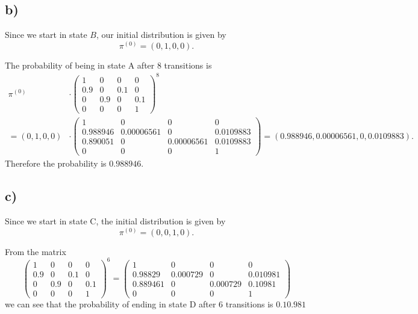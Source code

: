 \documentclass[a4paper]{article}
\begin{document}
\subsection*{b)}
Since we start in state $B$, our initial distribution is given by 
$$\pi^{(0)} = (0,1,0,0).$$

The probability of being in state A after 8 transitions is 
\begin{align*} \pi^{(0)} &\cdot \begin{pmatrix} 
									1 	& 0 	& 0 	& 0 	\\
									0.9 	& 0 	& 0.1 	& 0 \\
									0 	& 0.9 	& 0 	& 0.1 	\\
									0 	& 0 	& 0 	& 1 	
								\end{pmatrix}^8 \\
= (0,1,0,0) &\cdot \begin{pmatrix} 
									1 	& 0 	& 0 	& 0 	\\
									0.988946 	& 0.00006561 	& 0 	& 0.0109883 \\
									0.890051 	& 0 	& 0.00006561 	& 0.0109883 	\\
									0 	& 0 	& 0 	& 1 	
								\end{pmatrix} = (0.988946, 0.00006561, 0, 0.0109883).                                
\end{align*}
Therefore the probability is $0.988946$.

\subsection*{c)}
Since we start in state C, the initial distribution is given by
$$\pi^{(0)} = (0,0,1,0).$$

From the matrix 
$$
\begin{pmatrix} 
1 	& 0 	& 0 	& 0 	\\
0.9 & 0 	& 0.1 	& 0 	\\
0 	& 0.9 	& 0 	& 0.1 	\\
0 	& 0 	& 0 	& 1 	
\end{pmatrix}^6 
= 
\begin{pmatrix} 
1 	& 0 	& 0 	& 0 	\\
0.98829 & 0.000729 	& 0 	& 0.010981 	\\
0.889461 	& 0 	& 0.000729 	& 0.10981 	\\
0 	& 0 	& 0 	& 1 	
\end{pmatrix} 
$$
we can see that the probability of ending in state D after 6 transitions is $0.10.981$
\end{document}
